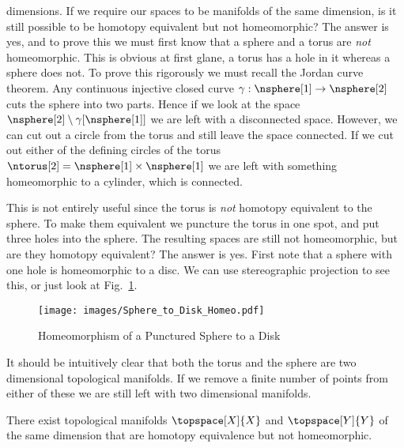 \documentclass[oneside]{book}                                                  %
\begin{document}
                dimensions. If we require our spaces to be manifolds of the
                same dimension, is it still possible to be homotopy equivalent
                but not homeomorphic? The answer is yes, and to prove this we
                must first know that a sphere and a torus are \textit{not}
                homeomorphic. This is obvious at first glane, a torus has a hole
                in it whereas a sphere does not. To prove this rigorously we
                must recall the Jordan curve theorem. Any continuous injective
                closed curve $\gamma:\nsphere[1]\rightarrow\nsphere[2]$ cuts the
                sphere into two parts. Hence if we look at the space
                $\nsphere[2]\setminus\gamma[\nsphere[1]]$ we are left with a
                disconnected space. However, we can cut out a circle from the
                torus and still leave the space connected. If we cut out either
                of the defining circles of the torus
                $\ntorus[2]=\nsphere[1]\times\nsphere[1]$ we are left with
                something homeomorphic to a cylinder, which is connected.
                \par\hfill\par
                This is not entirely useful since the torus is \textit{not}
                homotopy equivalent to the sphere. To make them equivalent we
                puncture the torus in one spot, and put three holes into the
                sphere. The resulting spaces are still not homeomorphic, but
                are they homotopy equivalent? The answer is yes. First note that
                a sphere with one hole is homeomorphic to a disc. We can use
                stereographic projection to see this, or just look at
                Fig.~\ref{fig:homeo_Punc_S2_and_Plane}.
                \begin{figure}[H]
                    \centering
                    \captionsetup{type=figure}
                    \texttt{[image: images/Sphere\_to\_Disk\_Homeo.pdf]}
                    \caption{Homeomorphism of a Punctured Sphere to a Disk}
                    \label{fig:homeo_Punc_S2_and_Plane}
                \end{figure}
                It should be intuitively clear that both the torus and the
                sphere are two dimensional topological manifolds. If we remove a
                finite number of points from either of these we are still left
                with two dimensional manifolds.
                \begin{theorem}
                    There exist topological manifolds $\topspace[X]{X}$ and
                    $\topspace[Y]{Y}$ of the same dimension that are homotopy
                    equivalence but not homeomorphic.
                \end{theorem}
\end{document}
